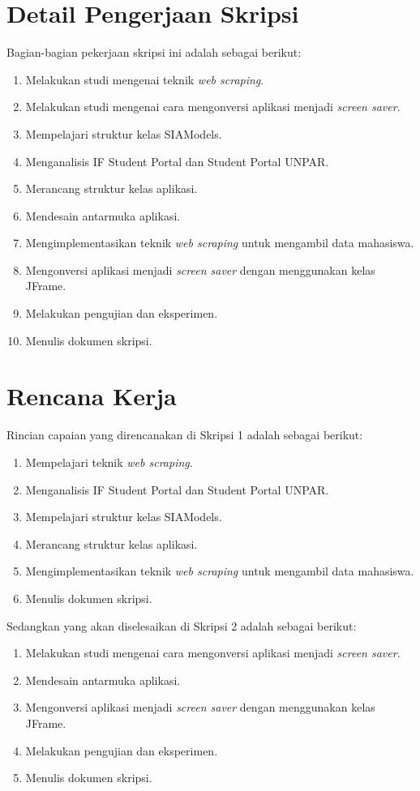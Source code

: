 \documentclass[a4paper,twoside]{article}
\begin{document}
\section{Detail Pengerjaan Skripsi}
Bagian-bagian pekerjaan skripsi ini adalah sebagai berikut:
	\begin{enumerate}
		\item Melakukan studi mengenai teknik \textit{web scraping}.
		\item Melakukan studi mengenai cara mengonversi aplikasi menjadi \textit{screen saver}.
		\item Mempelajari struktur kelas SIAModels.
		\item Menganalisis IF Student Portal dan Student Portal UNPAR.
		\item Merancang struktur kelas aplikasi.
	    \item Mendesain antarmuka aplikasi.
	    \item Mengimplementasikan teknik \textit{web scraping} untuk mengambil data mahasiswa.
        \item Mengonversi aplikasi menjadi \textit{screen saver} dengan menggunakan kelas JFrame. 
		\item Melakukan pengujian dan eksperimen.
		\item Menulis dokumen skripsi.
	\end{enumerate}

\section{Rencana Kerja}
Rincian capaian yang direncanakan di Skripsi 1 adalah sebagai berikut:
\begin{enumerate}
\item Mempelajari teknik \textit{web scraping}.
\item Menganalisis IF Student Portal dan Student Portal UNPAR.
\item Mempelajari struktur kelas SIAModels.
\item Merancang struktur kelas aplikasi.
\item Mengimplementasikan teknik \textit{web scraping} untuk mengambil data mahasiswa.
\item Menulis dokumen skripsi.
\end{enumerate}

Sedangkan yang akan diselesaikan di Skripsi 2 adalah sebagai berikut:
\begin{enumerate}
\item Melakukan studi mengenai cara mengonversi aplikasi menjadi \textit{screen saver}.
\item Mendesain antarmuka aplikasi.
\item Mengonversi aplikasi menjadi \textit{screen saver} dengan menggunakan kelas JFrame. 
\item Melakukan pengujian dan eksperimen.
\item Menulis dokumen skripsi.
\end{enumerate}
\end{document}
